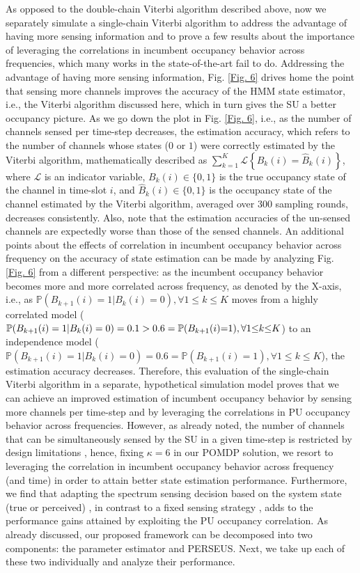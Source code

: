 \documentclass[12pt, draftcls, onecolumn]{IEEEtran}
\begin{document}
As opposed to the double-chain Viterbi algorithm described above, now we separately simulate a single-chain Viterbi algorithm to address the advantage of having more sensing information and to prove a few results about the importance of leveraging the correlations in incumbent occupancy behavior across frequencies, which many works in the state-of-the-art fail to do. Addressing the advantage of having more sensing information, Fig. \ref{Fig. 6} drives home the point that sensing more channels improves the accuracy of the HMM state estimator, i.e., the Viterbi algorithm discussed here, which in turn gives the SU a better occupancy picture. As we go down the plot in Fig. \ref{Fig. 6}, i.e., as the number of channels sensed per time-step decreases, the estimation accuracy, which refers to the number of channels whose states ($0$ or $1$) were correctly estimated by the Viterbi algorithm, mathematically described as $\sum_{k{=}1}^{K}\mathcal{L}\left\{B_{k}(i){=}\hat{B}_{k}(i)\right\}$, where $\mathcal{L}$ is an indicator variable, $B_{k}(i){\in}\{0,1\}$ is the true occupancy state of the channel in time-slot $i$, and $\hat{B}_{k}(i){\in}\{0,1\}$ is the occupancy state of the channel estimated by the Viterbi algorithm, averaged over $300$ sampling rounds, decreases consistently. Also, note that the estimation accuracies of the un-sensed channels are expectedly worse than those of the sensed channels. An additional points about the effects of correlation in incumbent occupancy behavior across frequency on the accuracy of state estimation can be made by analyzing Fig. \ref{Fig. 6} from a different perspective: as the incumbent occupancy behavior becomes more and more correlated across frequency, as denoted by the X-axis, i.e., as $\mathbb{P}(B_{k+1}(i){=}1|B_{k}(i){=}0),{\forall}1{\leq}k{\leq}K$ moves from a highly correlated model ($\mathbb{P}(B_{k+1}(i) = 1|B_{k}(i) = 0) = 0.1 > 0.6 = \mathbb{P}(B_{k+1}(i){=}1),\\{\forall}1{\leq}k{\leq}K$) to an independence model ($\mathbb{P}(B_{k+1}(i){=}1|B_{k}(i){=}0){=}0.6{=}\mathbb{P}(B_{k+1}(i){=}1),{\forall}1{\leq}k{\leq}K$), the estimation accuracy decreases. Therefore, this evaluation of the single-chain Viterbi algorithm in a separate, hypothetical simulation model proves that we can achieve an improved estimation of incumbent occupancy behavior by sensing more channels per time-step and by leveraging the correlations in PU occupancy behavior across frequencies. However, as already noted, the number of channels that can be simultaneously sensed by the SU in a given time-step is restricted by design limitations \cite{WCL:3}, hence, fixing $\kappa{=}6$ in our POMDP solution, we resort to leveraging the correlation in incumbent occupancy behavior across frequency (and time) in order to attain better state estimation performance. Furthermore, we find that adapting the spectrum sensing decision based on the system state (true or perceived) \cite{WCL:5}, in contrast to a fixed sensing strategy \cite{WCL:6, WCL:7}, adds to the performance gains attained by exploiting the PU occupancy correlation. As already discussed, our proposed framework can be decomposed into two components: the parameter estimator and PERSEUS. Next, we take up each of these two individually and analyze their performance.
\end{document}
